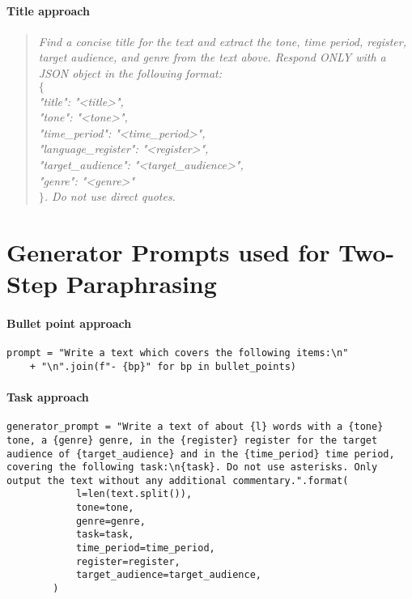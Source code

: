 \paragraph{Title approach}
\begin{quote}
\textit{
Find a concise title for the text and extract the tone, time period, register, target audience, and genre from the text above. 
Respond ONLY with a JSON object in the following format: \\
$\{$ \\
\hspace{1em}"title": "<title>", \\
\hspace{1em}"tone": "<tone>", \\
\hspace{1em}"time\_period": "<time\_period>", \\
\hspace{1em}"language\_register": "<register>", \\
\hspace{1em}"target\_audience": "<target\_audience>", \\
\hspace{1em}"genre": "<genre>" \\
$\}$. 
Do not use direct quotes.
}
\end{quote}


\section{Generator Prompts used for Two-Step Paraphrasing}
\label{app:generator_prompts}

\paragraph{Bullet point approach}
\begin{verbatim}
prompt = "Write a text which covers the following items:\n" 
    + "\n".join(f"- {bp}" for bp in bullet_points)
\end{verbatim}

\paragraph{Task approach}
\begin{verbatim}
generator_prompt = "Write a text of about {l} words with a {tone} tone, a {genre} genre, in the {register} register for the target audience of {target_audience} and in the {time_period} time period, covering the following task:\n{task}. Do not use asterisks. Only output the text without any additional commentary.".format(
            l=len(text.split()),
            tone=tone,
            genre=genre,
            task=task,
            time_period=time_period,
            register=register,
            target_audience=target_audience,
        )
\end{verbatim}

